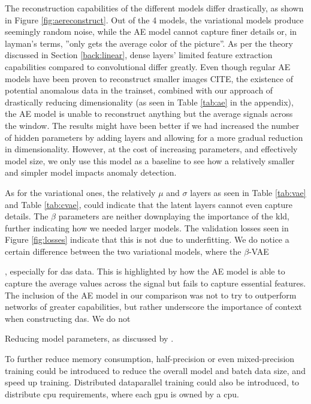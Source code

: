 The reconstruction capabilities of the different models differ drastically, as shown in Figure \ref{fig:aereconstruct}. Out of the 4 models, the variational models produce seemingly random noise, while the AE model cannot capture finer details or, in layman's terms, ''only gets the average color of the picture''. As per the theory discussed in Section \ref{back:linear}, dense layers' limited feature extraction capabilities compared to convolutional differ greatly. Even though regular AE models have been proven to reconstruct smaller images CITE, the existence of potential anomalous data in the trainset, combined with our approach of drastically reducing dimensionality (as seen in Table \ref{tab:ae} in the appendix), the AE model is unable to reconstruct anything but the average signals across the window. The results might have been better if we had increased the number of hidden parameters by adding layers and allowing for a more gradual reduction in dimensionality. However, at the cost of increasing parameters, and effectively model size, we only use this model as a baseline to see how a relatively smaller and simpler model impacts anomaly detection.

As for the variational ones, the relatively $\mu$ and $\sigma$ layers as seen in Table \ref{tab:vae} and Table \ref{tab:cvae}, could indicate that the latent layers cannot even capture details. The $\beta$ parameters are neither downplaying the importance of the \acrshort{kld}, further indicating how we needed larger models. The validation losses seen in Figure \ref{fig:losses} indicate that this is not due to underfitting. We do notice a certain difference between the two variational models, where the $\beta$-VAE

, especially for \acrshort{das} data. This is highlighted by how the AE model is able to capture the average values across the signal but fails to capture essential features. The inclusion of the AE model in our comparison was not to try to outperform networks of greater capabilities, but rather underscore the importance of context when constructing \acrshort{das}. We do not 

Reducing model parameters, as discussed by \cite{s23021009}. 

To further reduce memory consumption, half-precision or even mixed-precision training could be introduced to reduce the overall model and batch data size, and speed up training. Distributed dataparallel training could also be introduced, to distribute \acrshort{cpu} requirements, where each \acrshort{gpu} is owned by a \acrshort{cpu}.
 

